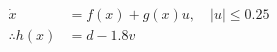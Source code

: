 \documentclass[preview]{standalone}
\begin{document}
\begin{align*}
\dot x &= f(x) + g(x) u,  \quad |u| \leq 0.25\\ \therefore h(x) &= d - 1.8 v
\end{align*}
\end{document}
